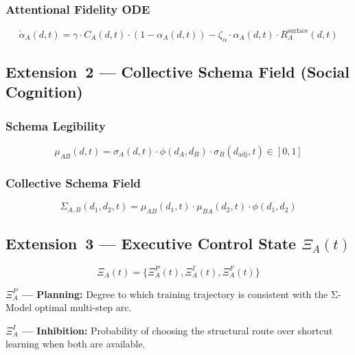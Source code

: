 \documentclass[10pt]{article}
\begin{document}
\subsubsection{Attentional Fidelity ODE}
\begin{equation}\label{eq:alpha-ode}
\dot{\alpha}_A(d,t) = \gamma \cdot C_A(d,t) \cdot (1 - \alpha_A(d,t)) - \zeta_{\alpha} \cdot \alpha_A(d,t) \cdot R_A^{\text{surface}}(d,t)
\end{equation}

\subsection{Extension~2 --- Collective Schema Field (Social Cognition)}\label{sec:social}

\subsubsection{Schema Legibility}
\begin{equation}\label{eq:schema-legibility}
\mu_{AB}(d,t) = \sigma_A(d,t) \cdot \phi(d_A, d_B) \cdot \sigma_B(d_{\text{adj}},t) \in [0,1]
\end{equation}

\subsubsection{Collective Schema Field}
\begin{equation}\label{eq:collective-field}
\Sigma_{A,B}(d_1,d_2,t) = \mu_{AB}(d_1,t) \cdot \mu_{BA}(d_2,t) \cdot \phi(d_1,d_2)
\end{equation}

\subsection{Extension~3 --- Executive Control State \texorpdfstring{$\Xi_A(t)$}{Xi\_A(t)}}\label{sec:executive}

\begin{equation}\label{eq:executive-state}
\Xi_A(t) = \{\Xi_A^P(t), \Xi_A^I(t), \Xi_A^F(t)\}
\end{equation}

\textbf{$\Xi_A^P$ --- Planning:} Degree to which training trajectory is
consistent with the Σ-Model optimal multi-step arc.

\textbf{$\Xi_A^I$ --- Inhibition:} Probability of choosing the structural
route over shortcut learning when both are available.
\end{document}
